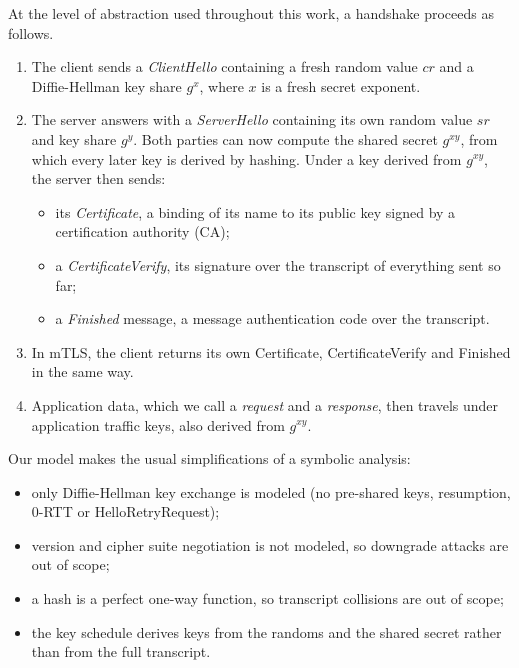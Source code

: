 \documentclass[11pt]{article}
\begin{document}
At the level of abstraction used throughout this work, a handshake proceeds as follows.
\begin{enumerate}
    \item The client sends a \textit{ClientHello} containing a fresh random value $cr$ and a Diffie-Hellman key share $g^{x}$, where $x$ is a fresh secret exponent.
    \item The server answers with a \textit{ServerHello} containing its own random value $sr$ and key share $g^{y}$. Both parties can now compute the shared secret $g^{xy}$, from which every later key is derived by hashing. Under a key derived from $g^{xy}$, the server then sends:
    \begin{itemize}
        \item its \textit{Certificate}, a binding of its name to its public key signed by a certification authority (CA);
        \item a \textit{CertificateVerify}, its signature over the transcript of everything sent so far;
        \item a \textit{Finished} message, a message authentication code over the transcript.
    \end{itemize}
    \item In mTLS, the client returns its own Certificate, CertificateVerify and Finished in the same way.
    \item Application data, which we call a \textit{request} and a \textit{response}, then travels under application traffic keys, also derived from $g^{xy}$.
\end{enumerate}

Our model makes the usual simplifications of a symbolic analysis:
\begin{itemize}
    \item only Diffie-Hellman key exchange is modeled (no pre-shared keys, resumption, 0-RTT or HelloRetryRequest);
    \item version and cipher suite negotiation is not modeled, so downgrade attacks are out of scope;
    \item a hash is a perfect one-way function, so transcript collisions are out of scope;
    \item the key schedule derives keys from the randoms and the shared secret rather than from the full transcript.
\end{itemize}
\end{document}
